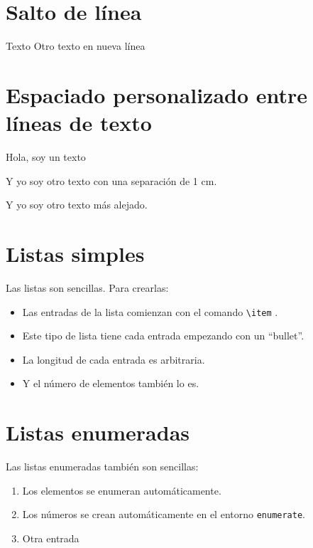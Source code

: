 \newpage


\section{Salto de línea}

Texto
\newline
Otro texto en nueva línea


\section{Espaciado personalizado entre líneas de texto}

Hola, soy un texto

\vspace{1cm}
Y yo soy otro texto con una separación de 1 cm.

\vspace{50pt}
Y yo soy otro texto más alejado.




\section{Listas simples}

Las listas son sencillas. Para crearlas:
\begin{itemize}
  \item Las entradas de la lista comienzan con el comando \verb|\item| .
  \item Este tipo de lista tiene cada entrada empezando con un ``bullet''.
  \item La longitud de cada entrada es arbitraria.
  \item Y el número de elementos también lo es.
\end{itemize}


\section{Listas enumeradas}

Las listas enumeradas también son sencillas:
\begin{enumerate}
  \item Los elementos se enumeran automáticamente.
  \item Los números  se crean automáticamente en el entorno \texttt{enumerate}.
  \item Otra entrada
\end{enumerate}

